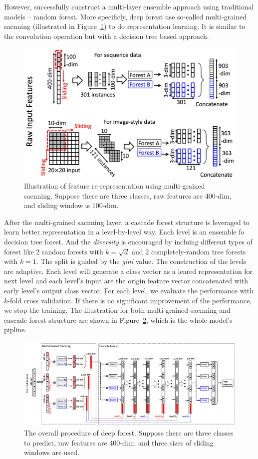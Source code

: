 \documentclass[sigconf]{acmart}
\begin{document}
	However, \citet{zhou2017deep} successfully construct a multi-layer ensemble approach using traditional models -- random forest. More specificly, deep forest use so-called multi-grained sacnning (illustrated in Figure~\ref{fig:multi-grained-scanning}) to do representation learning. It is similar to the convolution operation but with a decision tree based approach. 
	\begin{figure}[h]
	\centering
	\includegraphics[width=0.8\linewidth]{../figs/multi-grained-scanning}
	\caption{ Illustration of feature re-representation using multi-grained sacnning. Suppose there are three classes, raw features are 400-dim, and sliding window is 100-dim.}
	\label{fig:multi-grained-scanning}
	\end{figure}
	
	After the multi-grained sacnning layer, a cascade forest structure is leveraged to learn better representation in a level-by-level way. Each level is an ensemble fo decision tree forest. And the \textit{diversity} is encouraged by incluing different types of forest like 2 random forests with $k=\sqrt{d}$ and 2 completely-random tree forests with $k=1$. The split is guided by the \textit{gini} value. The construction of the levels are adaptive. Each level will generate a class vector as a leared representation for next level and each level's input are the origin feature vector concatenated with early level's output class vector. For each level, we evaluate the performance with $k$-fold cross validation. If there is no significant improvement of the performance, we stop the training. The illustration for both multi-grained sacnning and cascade forest structure are shown in Figure~\ref{fig:deep-forest}, which is the whole model's pipline. 
	
	
	
\begin{figure}[h]
\centering
\includegraphics[width=0.9\linewidth]{../figs/deep-forest}
\caption{The overall procedure of deep forest. Suppose there are three classes to predict, raw features are 400-dim, and three sizes of sliding windows are used.}
\label{fig:deep-forest}
\end{figure}
\end{document}
